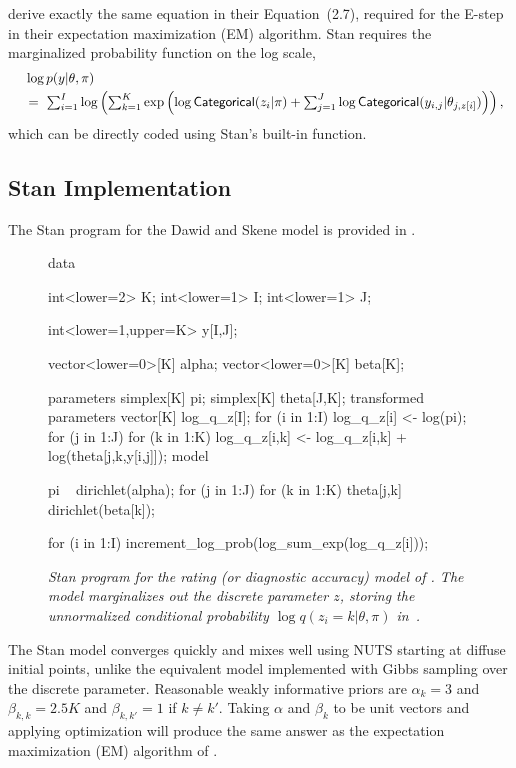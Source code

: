 \cite{DawidSkene:1979} derive exactly the same equation in their
Equation~(2.7), required for the E-step in their expectation
maximization (EM) algorithm.  Stan requires the marginalized
probability function on the log scale,
\[
\begin{array}{l}
\mbox{ } \ \log p(y | \theta, \pi)
\\[3pt]
\mbox{ } \  = \
\sum_{i=1}^I \log \left( \sum_{k=1}^K \exp
  \left( \log \distro{Categorical}(z_i | \pi)
         + \sum_{j=1}^J
         \log \distro{Categorical}(y_{i,j}|\theta_{j,z[i]})
  \right) \right),
\end{array}
\]                            
which can be directly coded using Stan's built-in 
function.


\subsection{Stan Implementation}

The Stan program for the Dawid and Skene model is provided in
.
%
\begin{figure}
\begin{stancode}
data {
  int<lower=2> K;
  int<lower=1> I;
  int<lower=1> J;

  int<lower=1,upper=K> y[I,J];

  vector<lower=0>[K] alpha;
  vector<lower=0>[K] beta[K];
}
parameters {
  simplex[K] pi;
  simplex[K] theta[J,K];
}
transformed parameters {
  vector[K] log_q_z[I];
  for (i in 1:I) {
    log_q_z[i] <- log(pi);
    for (j in 1:J)
      for (k in 1:K)
        log_q_z[i,k] <- log_q_z[i,k] 
                        + log(theta[j,k,y[i,j]]);
  }
}
model {
  pi ~ dirichlet(alpha);
  for (j in 1:J)
    for (k in 1:K)
      theta[j,k] ~ dirichlet(beta[k]);

  for (i in 1:I)
    increment_log_prob(log_sum_exp(log_q_z[i]));
}
\end{stancode}
\vspace*{-12pt}
\caption{\small\it Stan program for the rating (or diagnostic
  accuracy) model of \cite{DawidSkene:1979}. The model marginalizes
  out the discrete parameter $z$, storing the unnormalized conditional
  probability $\log q(z_i=k|\theta,\pi)$ in\ \code{log\_q\_z[i,k]}.}%
\label{dawid-skene-model.figure}
\end{figure}
%
The Stan model converges quickly and mixes well using NUTS starting at
diffuse initial points, unlike the equivalent model implemented with
Gibbs sampling over the discrete parameter.  Reasonable weakly
informative priors are $\alpha_k = 3$ and $\beta_{k,k} = 2.5 K$ and
$\beta_{k,k'} = 1$ if $k \neq k'$.  Taking $\alpha$ and $\beta_k$ to
be unit vectors and applying optimization will produce the same answer
as the expectation maximization (EM) algorithm of
\cite{DawidSkene:1979}.  

